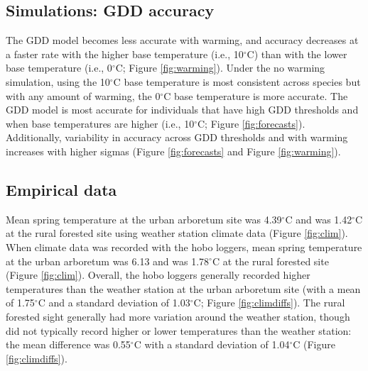 \documentclass{article}\usepackage[]{graphicx}\usepackage[]{color}
\begin{document}
\subsection*{Simulations: GDD accuracy}
The GDD model becomes less accurate with warming, and accuracy decreases at a faster rate with the higher base temperature (i.e., 10$^{\circ}$C) than with the lower base temperature (i.e., 0$^{\circ}$C; Figure \ref{fig:warming}). Under the no warming simulation, using the 10$^{\circ}$C base temperature is most consistent across species but with any amount of warming, the 0$^{\circ}$C base temperature is more accurate. The GDD model is most accurate for individuals that have high GDD thresholds and when base temperatures are higher (i.e., 10$^{\circ}$C; Figure \ref{fig:forecasts}). Additionally, variability in accuracy across GDD thresholds and with warming increases with higher sigmas (Figure \ref{fig:forecasts} and Figure \ref{fig:warming}).

\subsection*{Empirical data}
Mean spring temperature at the urban arboretum site was 4.39$^{\circ}$C and was 1.42$^{\circ}$C at the rural forested site using weather station climate data (Figure \ref{fig:clim}). When climate data was recorded with the hobo loggers, mean spring temperature at the urban arboretum was 6.13 and was 1.78$^{\circ}$C at the rural forested site (Figure \ref{fig:clim}). Overall, the hobo loggers generally recorded higher temperatures than the weather station at the urban arboretum site (with a mean of 1.75$^{\circ}$C and a standard deviation of 1.03$^{\circ}$C; Figure \ref{fig:climdiffs}). The rural forested sight generally had more variation around the weather station, though did not typically record higher or lower temperatures than the weather station: the mean difference was 0.55$^{\circ}$C with a standard deviation of 1.04$^{\circ}$C (Figure \ref{fig:climdiffs}).
\end{document}
